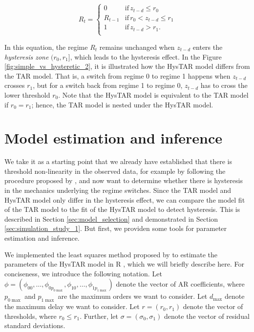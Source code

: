\documentclass{article}
\begin{document}
\begin{equation} \label{eqn:hysteretic_switching}
R_t = \begin{cases}
0 & \mathrm{if} \, z_{t-d} \le r_0 \\
R_{t-1} & \mathrm{if} \, r_0 < z_{t-d} \le r_1 \\
1 & \mathrm{if} \, z_{t-d} > r_1. \\
\end{cases}
\end{equation}

In this equation, the regime $R_t$ remains unchanged when $z_{t-d}$ enters the \textit{hysteresis zone} $(r_0, r_1]$, which leads to the hysteresis effect. In the Figure \ref{fig:simple_vs_hysteretic_2}, it is illustrated how the HysTAR model differs from the TAR model.
That is, a switch from regime 0 to regime 1 happens when $z_{t-d}$ crosses $r_1$, but for a switch back from regime 1 to regime 0, $z_{t-d}$ has to cross the lower threshold $r_0$.
Note that the HysTAR model is equivalent to the TAR model if $r_0 = r_1$; hence, the TAR model is nested under the HysTAR model.

\section{Model estimation and inference}
\label{sec:LS_estimation}
We take it as a starting point that we already have established that there is threshold non-linearity in the observed data, for example by following the procedure proposed by \citet{testing_for_threshold_nonlinearity}, and now want to determine whether there is hysteresis in the mechanics underlying the regime switches.
Since the TAR model and HysTAR model only differ in the hysteresis effect, we can compare the model fit of the TAR model to the fit of the HysTAR model to detect hysteresis. This is described in Section \ref{sec:model_selection} and demonstrated in Section \ref{sec:simulation_study_1}.
But first, we providen some tools for parameter estimation and inference.

We implemented the least squares method proposed by \citet{bar2} to estimate the parameters of the HysTAR model in \textsf{R} \citep{R, R_hystar}, which we will briefly describe here.
For conciseness, we introduce the following notation.
Let $\phi = (\phi_{00}, \dots, \phi_{0 p_{0\max}}, \phi_{10}, \dots, \phi_{1 p_{1\max}})$ denote the  vector of AR coefficients, where $p_{0\max}$ and $p_{1\max}$ are the maximum orders we want to consider.
Let $d_{\max}$ denote the maximum delay we want to consider.
Let $r = (r_0, r_1)$ denote the vector of thresholds, where $r_0 \le r_1$.
Further, let $\sigma = (\sigma_{0}, \sigma_{1})$ denote the  vector of residual standard deviations.
\end{document}
